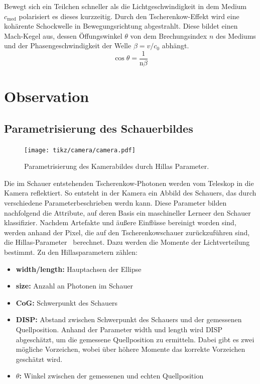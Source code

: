 Bewegt sich ein Teilchen schneller als die Lichtgeschwindigkeit in dem Medium $c_\text{med}$ polarisiert es dieses kurzzeitig. 
Durch den Tscherenkow-Effekt wird eine kohärente Schockwelle in Bewegungsrichtung abgestrahlt. 
Diese bildet einen Mach-Kegel aus, dessen Öffungswinkel $\theta$ von dem Brechungsindex $n$ des Mediums und der Phasengeschwindigkeit der Welle $\beta = v / c_\text{0}$ abhängt.
\begin{equation}
  \cos  \theta = \frac{1}{\text{n} \beta}
\end{equation}
\chapter{Observation}
\section{Parametrisierung des Schauerbildes}
\begin{figure}[H]
  \centering
  \texttt{[image: tikz/camera/camera.pdf]}
  \caption{Parametrisierung des Kamerabildes durch Hillas Parameter.}
\end{figure}
Die im Schauer entstehenden Tscherenkow-Photonen werden vom Teleskop in die Kamera reflektiert.
So entsteht in der Kamera ein Abbild des Schauers, das durch verschiedene Parameterbeschrieben werdn kann.
Diese Parameter bilden nachfolgend die Attribute, auf deren Basis ein maschineller Lerneer den Schauer klassifizier.
Nachdem Artefakte und äußere Einflüsse bereinigt worden sind, werden anhand der Pixel, die auf den Tscherenkowschauer zurückzuführen sind, die Hillas-Parameter~\cite{hillas} berechnet. 
Dazu werden die Momente der Lichtverteilung bestimmt. 
Zu den Hillasparametern zählen:
\begin{itemize}
  \item \textbf{width/length:} Hauptachsen der Ellipse
  \item \textbf{size:} Anzahl an Photonen im Schauer
  \item \textbf{CoG:} Schwerpunkt des Schauers
  \item \textbf{DISP:} Abstand zwischen Schwerpunkt des Schauers und der gemessenen Quellposition. Anhand der Parameter width und length wird DISP abgeschätzt, um die gemessene Quellposition zu ermitteln. Dabei gibt es zwei mögliche Vorzeichen, wobei über höhere Momente das korrekte Vorzeichen geschätzt wird.
  \item \textbf{$\theta$:} Winkel zwischen der gemessenen und echten Quellposition
\end{itemize}
